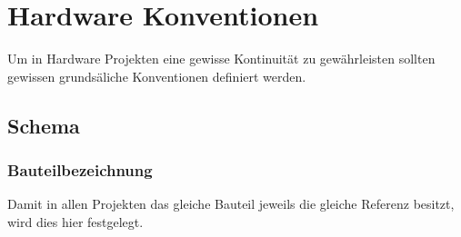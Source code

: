 



\section{Hardware Konventionen}
Um in Hardware Projekten eine gewisse Kontinuität zu gewährleisten sollten 
gewissen grundsäliche Konventionen definiert werden. 

\subsection{Schema}

\subsubsection{Bauteilbezeichnung}
Damit in allen Projekten das gleiche Bauteil jeweils die gleiche Referenz 
besitzt, wird dies hier festgelegt. 

